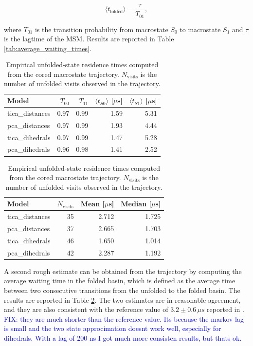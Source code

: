 \documentclass[prl,twocolumn]{revtex4-1}
\begin{document}
\begin{equation*}
    \langle t_{\mathrm{folded}} \rangle = \frac{\tau}{T_{01}},
\end{equation*}

where $T_{01}$ is the transition probability from macrostate $S_0$ to macrostate $S_1$ and $\tau$ is the lagtime of the MSM. Results are reported in Table \ref{tab:average_waiting_times}.

\begin{table}
\caption{MSM-implied average waiting times in the two PCCA macrostates. Waiting times were computed from the coarse-grained transition matrix as $\langle t_i \rangle = \tau/(1-T_{ii})$.}
\label{tab:average_waiting_times}
\begin{tabular}{lrrrr}
\hline
Model & $T_{00}$ & $T_{11}$ & $\langle t_{S0} \rangle$ [$\mu$s] & $\langle t_{S1} \rangle$ [$\mu$s] \\
\hline
tica\_distances & 0.97 & 0.99 & 1.59 & 5.31 \\
pca\_distances & 0.97 & 0.99 & 1.93 & 4.44 \\
tica\_dihedrals & 0.97 & 0.99 & 1.47 & 5.28 \\
pca\_dihedrals & 0.96 & 0.98 & 1.41 & 2.52 \\
\hline
\end{tabular}
\vspace*{1em}
\caption{Empirical unfolded-state residence times computed from the cored macrostate trajectory. $N_{\mathrm{visits}}$ is the number of unfolded visits observed in the trajectory.}
\label{tab:empirical_unfolded_residence_times}
\begin{tabular}{lrrr}
\hline
Model & $N_{\mathrm{visits}}$ & Mean [$\mu$s] & Median [$\mu$s] \\
\hline
tica\_distances & 35 & 2.712 & 1.725 \\
pca\_distances & 37 & 2.665 & 1.703 \\
tica\_dihedrals & 46 & 1.650 & 1.014 \\
pca\_dihedrals & 42 & 2.287 & 1.192 \\
\hline
\end{tabular}
\end{table}
A second rough estimate can be obtained from the trajectory by computing the average waiting time in the folded basin, which is defined as the average time between two consecutive transitions from the unfolded to the folded basin. The results are reported in Table \ref{tab:empirical_unfolded_residence_times}. 
The two estimates are in reasonable agreement, and they are also consistent with the reference value of $3.2\pm 0.6\,\mu s$ reported in \cite{Piana2012}. \textcolor{blue}{FIX: they are much shorter than the reference value. Its because the markov lag is small and the two state approcimation doesnt work well, especially for dihedrals. With a lag of 200 ns I got much more consisten results, but thats ok.}
\end{document}
